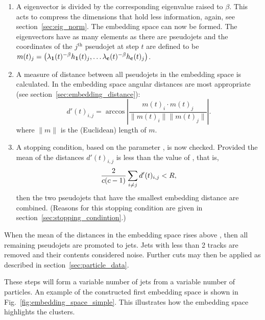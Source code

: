 \begin{enumerate}
        \item \label{step:compression} A eigenvector is divided by the corresponding eigenvalue raised to \(\beta\).
            This acts to compress the dimensions that hold less information, again, see section~\ref{sec:eig_norm}.
            The embedding space can now be formed.
            The eigenvectors have as many elements as there are pseudojets and the coordinates of
            the \(j^\text{th}\) pseudojet at step \(t\)
            are defined to be
            \(m(t)_j = \left(\lambda_{\textbf{1}}(t)^{-\beta} h_{\textbf{1}}(t)_j, \dots \lambda_{\textbf{c}}(t)^{-\beta} h_{\textbf{c}}(t)_j\right)\).

        \item  A measure of distance between all pseudojets in the embedding space is calculated.
            In the embedding space angular distances are most appropriate (see section~\ref{sec:embedding_distance}):
            \begin{equation}
                d'(t)_{i, j} = \arccos\left|\frac{m(t)_i\cdot m(t)_j}{\|m(t)_i\| \|m(t)_j\|}\right|.
            \end{equation}
            where \(\|m\|\) is the (Euclidean) length of \(m\).

        \item\label{step:stoppingcondition}

            A stopping condition, based on the parameter \stoppingdeltar{}, is now checked.
            Provided the mean of the distances \(d'(t)_{i, j}\) is less than 
            the value of \stoppingdeltar{}, that is,
            \begin{equation}
                \frac{2}{c(c-1)}\sum_{i\ne j} d'(t)_{i, j} < R{},
            \end{equation}
            then the two pseudojets that have the smallest embedding distance are combined.
            (Reasons for this stopping condition are given in section~\ref{sec:stopping_condintion}.)
        
     \end{enumerate}
    When the mean of the distances in the embedding space rises above \stoppingdeltar{},
    then all remaining pseudojets are promoted to jets.
    Jets with less than 2 tracks are removed and their contents considered noise.
    Further cuts may then be applied as described in section~\ref{sec:particle_data}.

    These steps will form a variable number of jets from a variable number of particles.
    An example of the constructed first embedding space is shown in Fig.~\ref{fig:embedding_space_simple}.
    This illustrates how the embedding space highlights the clusters.

